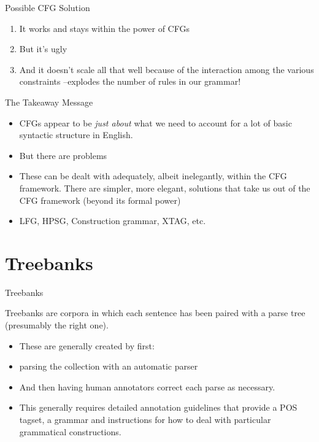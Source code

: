 \documentclass[9pt,xcolor=pdftex,dvipsnames,table]{beamer}
\begin{document}
\begin{frame}{Possible CFG Solution}
\begin{enumerate}
	\item It works and stays within the power of CFGs
	\item But it's ugly
	\item And it doesn't scale all that well because of the interaction among the various constraints --explodes the number of rules in our grammar!
\end{enumerate}
\end{frame}

\begin{frame}{The Takeaway Message}

\begin{itemize}
	\item CFGs appear to be \emph{just about} what we need to account for a lot of basic syntactic structure in English.
	\item But there are problems
	\item These can be dealt with adequately, albeit inelegantly, within the CFG framework.
There are simpler, more elegant, solutions that take us out of the CFG framework (beyond its formal power)
	\item LFG, HPSG, Construction grammar, XTAG, etc.
\end{itemize}
\end{frame}

\section{Treebanks}

\begin{frame}{Treebanks}

Treebanks are corpora in which each sentence
has been paired with a parse tree (presumably
the right one).

\begin{itemize}
	\item These are generally created by first:
	\item parsing the collection with an automatic
parser
	\item And then having human annotators correct each
parse as necessary.
	\item This generally requires detailed annotation
guidelines that provide a POS tagset, a grammar
and instructions for how to deal with particular
grammatical constructions.
\end{itemize}

\end{frame}
\end{document}
